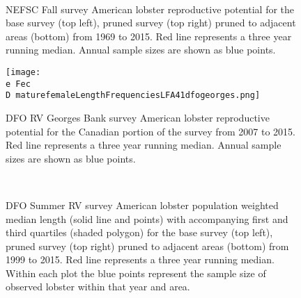 \documentclass[11pt]{article}
\newcommand{\D}{.}
\newcommand{\e}{/backup/bio_data/bio.lobster/figures/} %
\begin{document}
\begin{figure}
\centering
{}
\\
\caption{NEFSC Fall survey American lobster reproductive potential for the base survey (top left), pruned survey (top right) pruned to adjacent areas (bottom) from 1969 to 2015. Red line represents a three year running median. Annual sample sizes are shown as blue points.  }
\end{figure}
\clearpage


\begin{figure}

    \texttt{[image: \\e Fec\\D maturefemaleLengthFrequenciesLFA41dfogeorges.png]}
    \caption{DFO RV Georges Bank survey American lobster reproductive potential for the Canadian portion of the survey from 2007 to 2015. Red line represents a three year running median. Annual sample sizes are shown as blue points.  }

\end{figure}







\begin{figure}
\centering
{}
\\
\caption{DFO Summer RV survey American lobster population weighted median length (solid line and points) with accompanying first and third quartiles (shaded polygon) for the base survey (top left), pruned survey (top right) pruned to adjacent areas (bottom) from 1999 to 2015. Red line represents a three year running median. Within each plot the blue points represent the sample size of observed lobster within that year and area.}
\end{figure}
\clearpage
\end{document}
